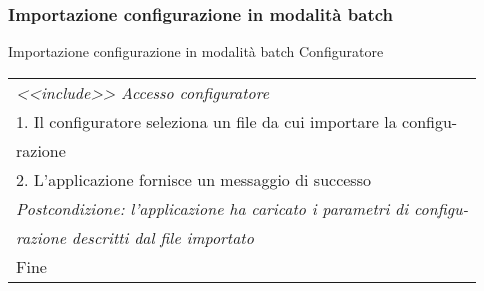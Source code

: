 \begin{minipage}{\textwidth}
    \subsubsection{Importazione configurazione in modalità batch}
    \usecase
        {Importazione configurazione in modalità batch}
        {
            Configuratore
        }
        {
            \begin{tabular}{l}
                \textit{<<include>> Accesso configuratore}\\
                1. Il configuratore seleziona un file da cui importare la configu-\\
                razione\\
                2. L'applicazione fornisce un messaggio di successo\\
                \textit{Postcondizione: l'applicazione ha caricato i parametri di configu-}\\
                \textit{razione descritti dal file importato}\\
                Fine
            \end{tabular}\\


        }
        \vspace{0.5cm}
\end{minipage}